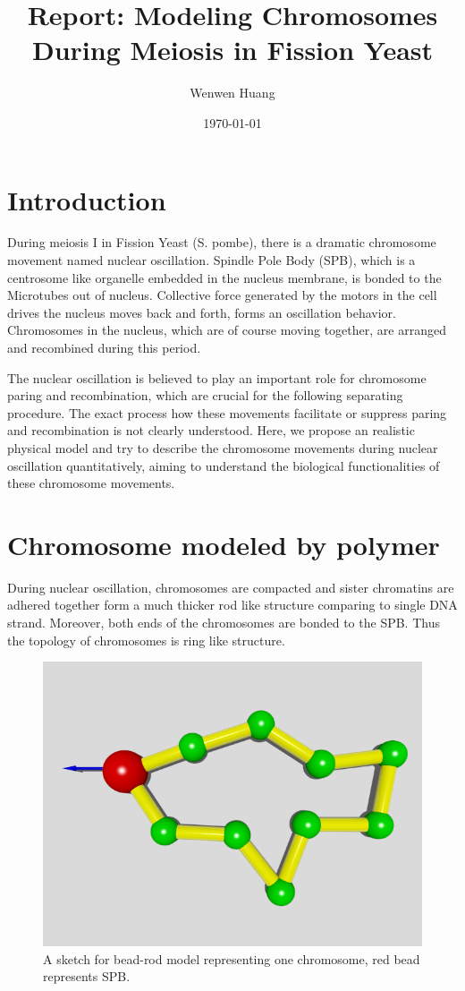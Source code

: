 \documentclass[12pt,a4paper]{article}
\begin{document}
\title{Report: Modeling Chromosomes During Meiosis in Fission Yeast}
\author{Wenwen Huang}
\date{\today}

\maketitle

\section{Introduction}
\label{sec:introduction}

During meiosis I in Fission Yeast (S. pombe), there is a dramatic chromosome
movement named nuclear oscillation. Spindle Pole Body (SPB), which is a
centrosome like organelle embedded in the nucleus membrane, is bonded to the
Microtubes out of nucleus. Collective force generated by the motors in the cell
drives the nucleus moves back and forth, forms an oscillation behavior.
Chromosomes in the nucleus, which are of course moving together, are arranged
and recombined during this period. 

The nuclear oscillation is believed to play an important role for chromosome
paring and recombination, which are crucial for the following separating
procedure. The exact process how these movements facilitate or suppress
paring and recombination is not clearly understood. Here, we propose an
realistic physical model and try to describe the chromosome movements during
nuclear oscillation quantitatively, aiming to understand the biological
functionalities of these chromosome movements.


\section{Chromosome modeled by polymer}
\label{sec:chromosome}

During nuclear oscillation, chromosomes are compacted and sister chromatins are
adhered together form a much thicker rod like structure comparing to single DNA
strand. Moreover, both ends of the chromosomes are bonded to the SPB. Thus the
topology of chromosomes is ring like structure. 
\begin{figure}[htpb]
	\centering
	\includegraphics[width=0.8\linewidth]{figs/Ring0.png}
	\caption{A sketch for bead-rod model representing one chromosome, red
		bead represents SPB.}
	\label{fig:Ring0}
\end{figure}
\end{document}
